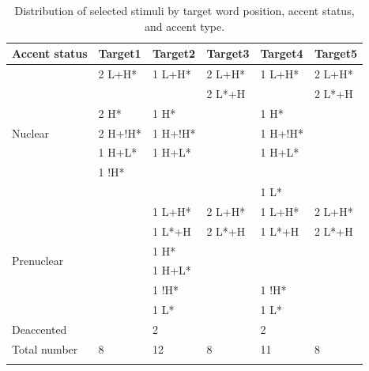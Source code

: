 \begin{table}[]
\begin{tabular}{llllll}
\lsptoprule
Accent status & Target1 & Target2 & Target3 & Target4 & Target5 \\
\midrule
\multirow{7}{*}{Nuclear}    & 2 L+H*           & 1 L+H*           & 2 L+H*           & 1 L+H*           & 2 L+H*           \\
                            &                  &                  & 2 L*+H           &                  & 2 L*+H           \\
                            & 2 H*             & 1 H*             &                  & 1 H*             &                  \\
                            & 2 H+!H*          & 1 H+!H*          &                  & 1 H+!H*          &                  \\
                            & 1 H+L*           & 1 H+L*           &                  & 1 H+L*           &                  \\
                            & 1 !H*            &                  &                  &                  &                  \\
                            &                  &                  &                  & 1 L*             &                  \\
                            \midrule
\multirow{6}{*}{Prenuclear} &                  & 1 L+H*           & 2 L+H*           & 1 L+H*           & 2 L+H*           \\
                            &                  & 1 L*+H           & 2 L*+H           & 1 L*+H           & 2 L*+H           \\
                            &                  & 1 H*             &                  &                  &                  \\
                            &                  & 1 H+L*           &                  &                  &                  \\
                            &                  & 1 !H*            &                  & 1 !H*            &                  \\
                            &                  & 1 L*             &                  & 1 L*             &                  \\
                            \midrule
Deaccented                  &                  & 2                &                  & 2                &                  \\
\midrule
Total number                       & 8                & 12               & 8                & 11               & 8                \\
\lspbottomrule
\end{tabular}
\caption{Distribution of selected stimuli by target word position, accent status, and accent type.}
\label{table:s3_stimuli}
\end{table}

